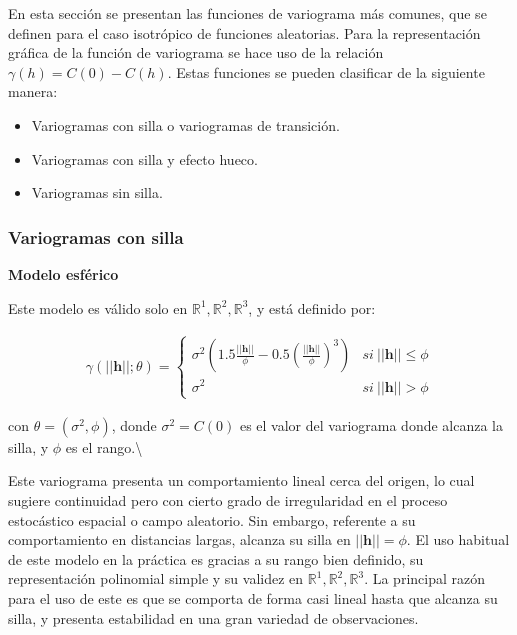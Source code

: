 \documentclass[
]{book}
\providecommand{\tightlist}{%
  \setlength{\itemsep}{0pt}\setlength{\parskip}{0pt}}
\begin{document}
En esta sección se presentan las funciones de variograma más comunes, que se definen para el caso isotrópico de funciones aleatorias. Para la representación gráfica de la función de variograma se hace uso de la relación \(\gamma(h)=C(0)-C(h)\). Estas funciones se pueden clasificar de la siguiente manera:

\begin{itemize}
\tightlist
\item
  Variogramas con silla o variogramas de transición.
\item
  Variogramas con silla y efecto hueco.
\item
  Variogramas sin silla.
\end{itemize}

\hypertarget{variogramas-con-silla}{%
\subsubsection*{Variogramas con silla}\label{variogramas-con-silla}}

\textbf{Modelo esférico}

Este modelo es válido solo en \(\mathbb{R}^1,\mathbb{R}^2,\mathbb{R}^3\), y está definido por:

\begin{align}
    \gamma(||\textbf{h}||;\theta) = \left \{ \begin{matrix} \sigma^2\left(1.5\frac{||\textbf{h}||}{\phi}-0.5\left(\frac{||\textbf{h}||}{\phi}\right)^3 \right) &  si \ ||\textbf{h}||\leq \phi
\\ \sigma^2 &  si\ ||\textbf{h}||>\phi \end{matrix}\right. 
\end{align}

con \(\theta=(\sigma^2,\phi)\), donde \(\sigma^2=C(0)\) es el valor del variograma donde alcanza la silla, y \(\phi\) es el rango.\textbackslash{}

Este variograma presenta un comportamiento lineal cerca del origen, lo cual sugiere continuidad pero con cierto grado de irregularidad en el proceso estocástico espacial o campo aleatorio. Sin embargo, referente a su comportamiento en distancias largas, alcanza su silla en \(||\textbf{h}||=\phi\). El uso habitual de este modelo en la práctica es gracias a su rango bien definido, su representación polinomial simple y su validez en \(\mathbb{R}^1,\mathbb{R}^2,\mathbb{R}^3\). La principal razón para el uso de este es que se comporta de forma casi lineal hasta que alcanza su silla, y presenta estabilidad en una gran variedad de observaciones.
\end{document}
